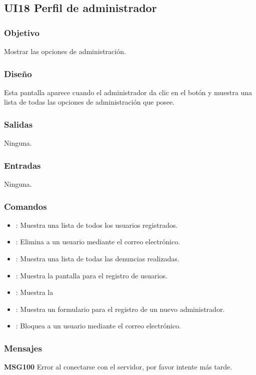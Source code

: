 \subsection{UI18 Perfil de administrador}

\subsubsection{Objetivo}
	Mostrar las opciones de administración.

\subsubsection{Diseño}
	Esta pantalla aparece cuando el administrador da clic en el botón  y muestra una lista de todas las opciones de administración que posee.


\subsubsection{Salidas}

	Ninguna.

\subsubsection{Entradas}

	Ninguna.

\subsubsection{Comandos}
\begin{itemize}
	\item {}: Muestra una lista de todos los usuarios registrados.
	\item {}: Elimina a un usuario mediante el correo electrónico.
	\item {}: Muestra una lista de todas las denuncias realizadas.
	\item {}: Muestra la pantalla para el registro de usuarios.
	 \item {}: Muestra la 
	 \item {}: Muestra un formulario para el registro de un nuevo administrador.
	 \item {}: Bloquea a un usuario mediante el correo electrónico.
\end{itemize}

\subsubsection{Mensajes}
	\begin{Citemize}
		\item {\bf MSG100} Error al conectarse con el servidor, por favor intente más tarde.
	\end{Citemize}